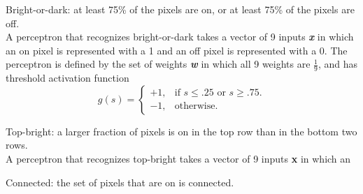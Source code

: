 \documentclass[solution, letterpaper]{cs121}
\begin{document}

\problem{} 

\subproblem Bright-or-dark: at least 75\% of the pixels are on, or at least 75\% of the pixels are off. \\

A perceptron that recognizes bright-or-dark takes a vector of 9 inputs {\textbf{\emph{x}}} in which an on pixel is represented with a 1 and an off pixel is represented with a 0. The perceptron is defined by the set of weights {\textbf{\emph{w}}} in which all 9 weights are $\frac{1}{9}$, and has threshold activation function
\begin{equation}
  g(s)=\begin{cases}
    +1, & \text{if $s \leq .25$ or $s \geq .75$}.\\
    -1, & \text{otherwise}.
  \end{cases}
\end{equation}

\subproblem Top-bright: a larger fraction of pixels is on in the top row than in the bottom two rows. \\

A perceptron that recognizes top-bright takes a vector of 9 inputs {\bf x} in which an


\subproblem Connected: the set of pixels that are on is connected. \\




\problem{}

\problem{}

\problem{}
\end{document}
